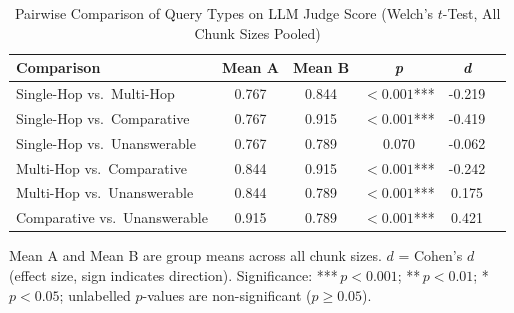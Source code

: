 
\begin{table}[!t]
  \caption{Pairwise Comparison of Query Types on LLM Judge Score (Welch's $t$-Test, All Chunk Sizes Pooled)}
  \label{tab:querytype_pairwise}
  \centering
  \renewcommand{\arraystretch}{1.2}
  \begin{tabular}{lccccc}
    \hline
    \textbf{Comparison} & \textbf{Mean A} & \textbf{Mean B} & \textbf{\textit{p}} & \textbf{\textit{d}} \\
    \hline
    Single-Hop vs.\ Multi-Hop & 0.767 & 0.844 & $<0.001$*** & -0.219 \\
    Single-Hop vs.\ Comparative & 0.767 & 0.915 & $<0.001$*** & -0.419 \\
    Single-Hop vs.\ Unanswerable & 0.767 & 0.789 & $0.070$\phantom{***} & -0.062 \\
    Multi-Hop vs.\ Comparative & 0.844 & 0.915 & $<0.001$*** & -0.242 \\
    Multi-Hop vs.\ Unanswerable & 0.844 & 0.789 & $<0.001$*** & 0.175 \\
    Comparative vs.\ Unanswerable & 0.915 & 0.789 & $<0.001$*** & 0.421 \\
    \hline
  \end{tabular}
  \begin{tablenotes}
    \small
    \item Mean A and Mean B are group means across all chunk sizes.
    $d$ = Cohen's $d$ (effect size, sign indicates direction).
    Significance: ***\,$p < 0.001$; **\,$p < 0.01$; *\,$p < 0.05$;
    unlabelled $p$-values are non-significant ($p \geq 0.05$).
  \end{tablenotes}
\end{table}
